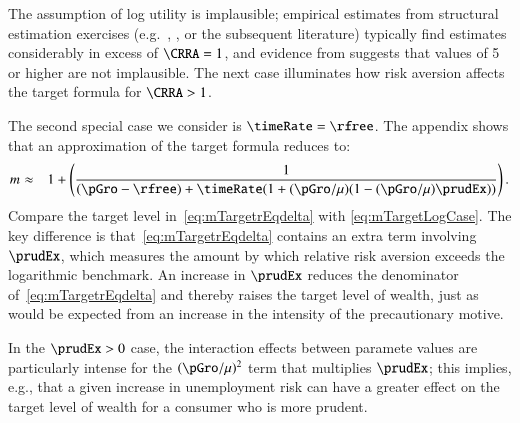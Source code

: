 \documentclass[titlepage,abstract]{\econtex}\newcommand{\texname}{ctDiscrete}
\begin{document}
The assumption of log utility is implausible; empirical estimates from
structural estimation exercises (e.g.\ \cite{gpLifeCycle},
\cite{cagettiWprofiles}, or the subsequent literature) typically
find estimates considerably in excess of $\CRRA = 1$, and evidence
from \cite{bjksPreferences} suggests that values of 5 or higher are
not implausible.  The next case illuminates how risk aversion affects the target formula for $\CRRA>1$.  

The second special case we consider is $\timeRate=\rfree$. 
The appendix shows that an approximation of the target formula reduces to:
\begin{eqnarray}
 \mTarg^{\null} & \approx & 1 + \left(\frac{1}{(\pGro-\rfree)+\timeRate(1+(\pGro/\urate)(1-(\pGro/\urate)\prudEx))}\right) \label{eq:mTargetrEqdelta}
.
\end{eqnarray}
Compare the target level in~\eqref{eq:mTargetrEqdelta} with
\eqref{eq:mTargetLogCase}. The key
difference is that~\eqref{eq:mTargetrEqdelta} contains
an extra term involving $\prudEx$, which measures the amount by which
relative risk aversion exceeds the logarithmic benchmark. An increase in $\prudEx$
reduces the denominator of~\eqref{eq:mTargetrEqdelta} and thereby
raises the target level of wealth, just as would be expected from an
increase in the intensity of the precautionary motive.  

In the $\prudEx>0$ case, the interaction effects between paramete
values are particularly intense for the $(\pGro/\urate)^2$ term that
multiplies $\prudEx$; this implies, e.g., that a given increase in
unemployment risk can have a greater effect on the target level of 
wealth for a consumer who is more prudent.
\end{document}
